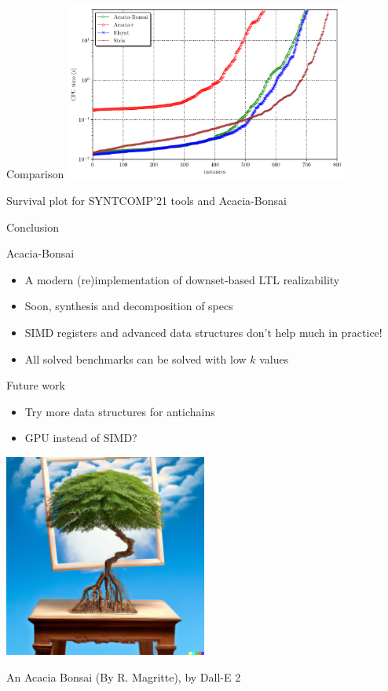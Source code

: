 \documentclass[aspectratio=169]{beamer}
\begin{document}

\begin{frame}{Comparison}
  \centering
  \includegraphics[width=0.7\textwidth]{../doc/tacas23/img/cactus}

  Survival plot for SYNTCOMP'21 tools and Acacia-Bonsai
\end{frame}

\begin{frame}{Conclusion}
  \begin{block}{Acacia-Bonsai}
    \begin{itemize}
      \item A modern (re)implementation of downset-based LTL realizability
      \item Soon, \alert{synthesis} and \alert{decomposition of specs}
      \item SIMD registers and advanced data structures don't help much in
        practice!
      \item All solved benchmarks can be solved with low $k$ values
    \end{itemize}
  \end{block}

  \pause

  \begin{block}{Future work}
    \begin{itemize}
      \item Try more data structures for antichains
      \item GPU instead of SIMD?
    \end{itemize}
  \end{block}
\end{frame}

\begin{frame}
  \centering
  \includegraphics[width=0.5\textwidth]{abonsai-magritte}

  An Acacia Bonsai (By R. Magritte), by Dall-E 2
\end{frame}
\end{document}

